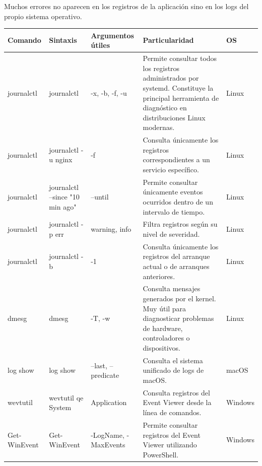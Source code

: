 \documentclass[a4paper,10pt]{article}
\begin{document}
Muchos errores no aparecen en los registros de la aplicación sino en los logs
del propio sistema operativo.

\begin{longtable}{|p{2.8cm}|p{3.3cm}|p{4cm}|p{5.3cm}|p{1.5cm}|}

\hline
Comando &
Sintaxis &
Argumentos útiles &
Particularidad &
OS
\\
\hline
\endhead

journalctl &
journalctl &
-x, -b, -f, -u &
Permite consultar todos los registros administrados por systemd. Constituye la principal herramienta de diagnóstico en distribuciones Linux modernas. &
Linux
\\
\hline

journalctl &
journalctl -u nginx &
-f &
Consulta únicamente los registros correspondientes a un servicio específico. &
Linux
\\
\hline

journalctl &
journalctl --since "10 min ago" &
--until &
Permite consultar únicamente eventos ocurridos dentro de un intervalo de tiempo. &
Linux
\\
\hline

journalctl &
journalctl -p err &
warning, info &
Filtra registros según su nivel de severidad. &
Linux
\\
\hline

journalctl &
journalctl -b &
-1 &
Consulta únicamente los registros del arranque actual o de arranques anteriores. &
Linux
\\
\hline

dmesg &
dmesg &
-T, -w &
Consulta mensajes generados por el kernel. Muy útil para diagnosticar problemas de hardware, controladores o dispositivos. &
Linux
\\
\hline

log show &
log show &
--last, --predicate &
Consulta el sistema unificado de logs de macOS. &
macOS
\\
\hline

wevtutil &
wevtutil qe System &
Application &
Consulta registros del Event Viewer desde la línea de comandos. &
Windows
\\
\hline

Get-WinEvent &
Get-WinEvent &
-LogName, -MaxEvents &
Permite consultar registros del Event Viewer utilizando PowerShell. &
Windows
\\
\hline

\end{longtable}

\end{document}
